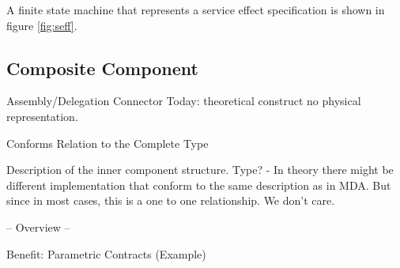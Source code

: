 A finite state machine that represents a service effect specification is shown
in figure \ref{fig:seff}.


\subsection{Composite Component}


Assembly/Delegation Connector 
Today: theoretical construct no physical representation.

Conforms Relation to the Complete Type

Description of the inner component structure. Type? -  In theory there might be
different implementation that conform to the same description as in MDA. But
since in most cases, this is a one to one relationship. We don't care.

-- Overview --

Benefit: Parametric Contracts (Example)
